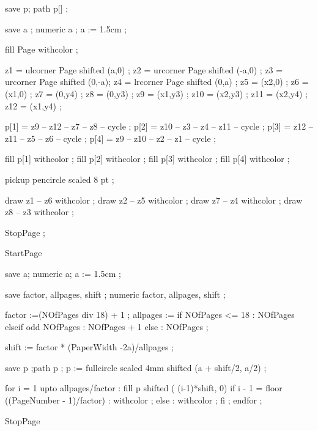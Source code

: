 save p; path p[] ;

save a ; numeric a ;
a := 1.5cm ;

fill Page withcolor  ;

z1 = ulcorner Page shifted (a,0) ; z2 = urcorner Page shifted (-a,0) ;
z3 = urcorner Page shifted (0,-a); z4 = lrcorner Page shifted (0,a)  ;
z5 = (x2,0) ;   z6 = (x1,0) ;
z7 = (0,y4) ;   z8 = (0,y3) ;
z9 = (x1,y3) ;  z10 = (x2,y3) ;
z11 = (x2,y4) ; z12 = (x1,y4) ;

p[1] = z9  -- z12 -- z7 -- z8  -- cycle ;
p[2] = z10 -- z3  -- z4 -- z11 -- cycle ;
p[3] = z12 -- z11 -- z5 -- z6  -- cycle ;
p[4] = z9  -- z10 -- z2 -- z1  -- cycle ;

fill p[1] withcolor  ;
fill p[2] withcolor  ;
fill p[3] withcolor  ;
fill p[4] withcolor  ;

pickup pencircle scaled 8 pt ;

draw z1 -- z6 withcolor  ;
draw z2 -- z5 withcolor  ;
draw z7 -- z4 withcolor  ;
draw z8 -- z3 withcolor  ;

StopPage ;
\stopuniqueMPgraphic 

StartPage

save a; numeric a;
a := 1.5cm ;   

save factor, allpages, shift ;
numeric factor, allpages, shift ;

factor :=(NOfPages div 18) + 1 ;
allpages := if NOfPages <= 18 : NOfPages elseif odd NOfPages : NOfPages + 1
            else : NOfPages ;

shift := factor * (PaperWidth -2a)/allpages ;

save p ;path p ;
p := fullcircle scaled 4mm shifted (a + shift/2, a/2) ;

for i = 1 upto allpages/factor :
  fill p shifted ( (i-1)*shift, 0) 
    if i - 1 = floor ((PageNumber - 1)/factor) :
      withcolor  ;
    else :
      withcolor  ;
    fi ;
endfor ;


StopPage
\stopuseMPgraphic


